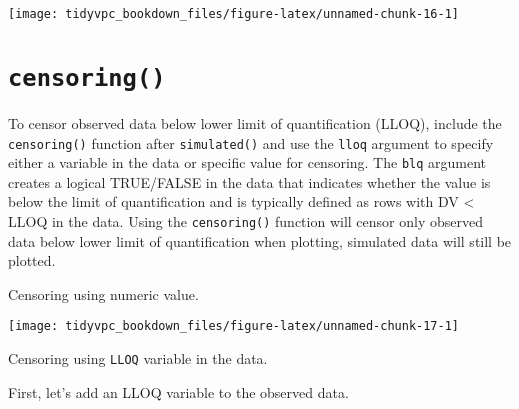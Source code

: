 \documentclass[
]{book}
\newenvironment{Shaded}{\begin{snugshade}}{\end{snugshade}}
\newcommand{\DataTypeTok}[1]{\textcolor[rgb]{0.13,0.29,0.53}{#1}}
\newcommand{\DecValTok}[1]{\textcolor[rgb]{0.00,0.00,0.81}{#1}}
\newcommand{\KeywordTok}[1]{\textcolor[rgb]{0.13,0.29,0.53}{\textbf{#1}}}
\newcommand{\NormalTok}[1]{#1}
\newcommand{\OperatorTok}[1]{\textcolor[rgb]{0.81,0.36,0.00}{\textbf{#1}}}
\newcommand{\StringTok}[1]{\textcolor[rgb]{0.31,0.60,0.02}{#1}}
\begin{document}
\texttt{[image: tidyvpc\_bookdown\_files/figure-latex/unnamed-chunk-16-1]}

\hypertarget{censoring}{%
\section{\texorpdfstring{\texttt{censoring()}}{censoring()}}\label{censoring}}

To censor observed data below lower limit of quantification (LLOQ), include the \texttt{censoring()} function after \texttt{simulated()} and use the \texttt{lloq} argument to specify either a variable in the data or specific value for censoring. The \texttt{blq} argument creates a logical TRUE/FALSE in the data that indicates whether the value is below the limit of quantification and is typically defined as rows with DV \textless{} LLOQ in the data. Using the \texttt{censoring()} function will censor only observed data below lower limit of quantification when plotting, simulated data will still be plotted.

Censoring using numeric value.

\begin{Shaded}
\end{Shaded}

\texttt{[image: tidyvpc\_bookdown\_files/figure-latex/unnamed-chunk-17-1]}

Censoring using \texttt{LLOQ} variable in the data.

First, let's add an LLOQ variable to the observed data.

\begin{Shaded}
\end{Shaded}
\end{document}
